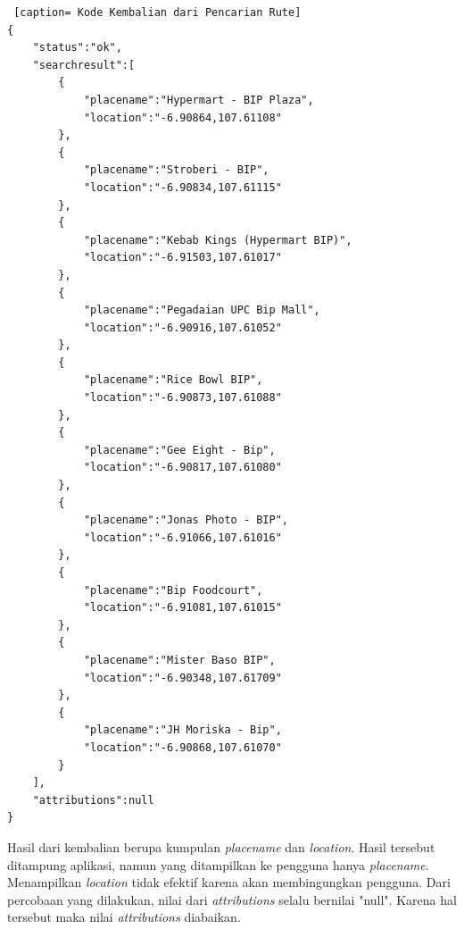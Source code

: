 \begin{lstlisting} [caption= Kode Kembalian dari Pencarian Rute]
{ 
	"status":"ok",
	"searchresult":[
		{
			"placename":"Hypermart - BIP Plaza",
			"location":"-6.90864,107.61108"
		},
		{
			"placename":"Stroberi - BIP",
			"location":"-6.90834,107.61115"
		},
		{
			"placename":"Kebab Kings (Hypermart BIP)",
			"location":"-6.91503,107.61017"
		},
		{
			"placename":"Pegadaian UPC Bip Mall",
			"location":"-6.90916,107.61052"
		},
		{
			"placename":"Rice Bowl BIP",
			"location":"-6.90873,107.61088"
		},
		{	
			"placename":"Gee Eight - Bip",
			"location":"-6.90817,107.61080"
		},
		{
			"placename":"Jonas Photo - BIP",
			"location":"-6.91066,107.61016"
		},
		{
			"placename":"Bip Foodcourt",
			"location":"-6.91081,107.61015"
		},
		{
			"placename":"Mister Baso BIP",
			"location":"-6.90348,107.61709"
		},
		{
			"placename":"JH Moriska - Bip",
			"location":"-6.90868,107.61070"
		}
	],
	"attributions":null
}
\end{lstlisting}

Hasil dari kembalian berupa kumpulan \textit{placename} dan \textit{location}. Hasil tersebut ditampung aplikasi, namun yang ditampilkan ke pengguna hanya \textit{placename}. Menampilkan \textit{location} tidak efektif karena akan membingungkan pengguna. Dari percobaan yang dilakukan, nilai dari \textit{attributions} selalu bernilai "null". Karena hal tersebut maka nilai \textit{attributions} diabaikan.

